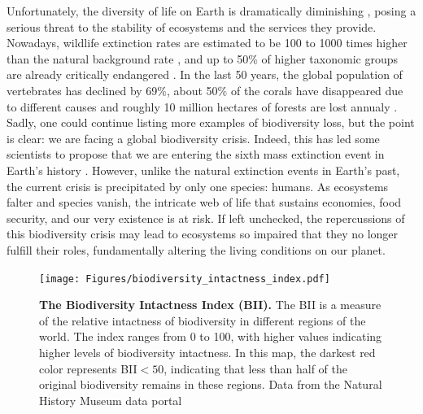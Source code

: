 Unfortunately, the diversity of life on Earth is dramatically diminishing
\cite{Hughes1997,Ceballos2002,Pereira2010}, posing a serious threat to the
stability of ecosystems and the services they provide. Nowadays, wildlife
extinction rates are estimated to be 100 to 1000 times higher than the natural
background rate \cite{Ceballos2015,Pimm2014}, and up to 50\% of higher
taxonomic groups are already critically endangered \cite{Smith2009}. In the
last 50 years, the global population of vertebrates has declined by 69\%, about
50\% of the corals have disappeared due to different causes and roughly 10
million hectares of forests are lost annualy \cite{WWF2022}. Sadly, one could
continue listing more examples of biodiversity loss, but the point is clear: we
are facing a global biodiversity crisis. Indeed, this has led some scientists
to propose that we are entering the sixth mass extinction event in Earth's
history \cite{Barnosky2011}. However, unlike the natural extinction events in
Earth’s past, the current crisis is precipitated by only one species: humans.
As ecosystems falter and species vanish, the intricate web of life that
sustains economies, food security, and our very existence is at risk. If left
unchecked, the repercussions of this biodiversity crisis may lead to ecosystems
so impaired that they no longer fulfill their roles, fundamentally altering the
living conditions on our planet.

\begin{figure}[H]
  \centering
  \texttt{[image: Figures/biodiversity\_intactness\_index.pdf]}
  \caption[The Biodiversity Intactness
    Index]{\label{fig:biodiversity_intactness_index} \textbf{The Biodiversity
      Intactness Index (BII).} The BII is a measure of the relative intactness
    of biodiversity in	different regions of the world. The index ranges from 0
    to 100, with higher values indicating higher levels of biodiversity
    intactness. In this map, the darkest red color represents BII$<50$,
    indicating that less than half of the original biodiversity remains in
    these regions. Data from the Natural History Museum data portal
    \cite{Newbold2016}}
\end{figure}

